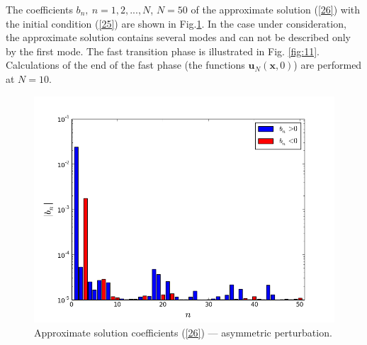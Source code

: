 \documentclass[authoryear]{elsarticle}
\begin{document}
The coefficients $b_n, \ n = 1,2, ..., N$, $N=50$ of the approximate solution (\ref{26}) with the initial condition (\ref{25}) are shown in Fig.\ref{fig:12}. 
In the case under consideration, the approximate solution contains several modes and can not be described only by the first mode. The fast transition phase is illustrated in Fig. \ref{fig:11}.
Calculations of the end of the fast phase (the functions $\bm u_N(\bm x, 0)$) are performed at  
$N=10$. 

\begin{figure}[!h]
  \begin{center}
    \includegraphics[width=0.95\linewidth] {12.png}
	\caption{Approximate solution coefficients (\ref{26}) --- asymmetric perturbation.}
	\label{fig:12}
  \end{center}
\end{figure} 
\end{document}
